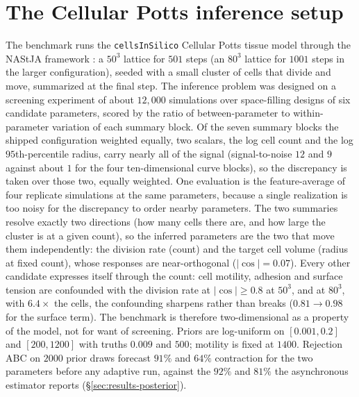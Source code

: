 \documentclass[10pt]{article}
\theoremstyle{plain}
\theoremstyle{definition}
\begin{document}
\section{The Cellular Potts inference setup}\label{app:cpm}
The benchmark runs the \texttt{cellsInSilico} Cellular Potts tissue model \citep{berghoff2020cis} through the NAStJA framework \citep{berghoff2018nastja}: a $50^3$ lattice for $501$ steps (an $80^3$ lattice for $1001$ steps in the larger configuration), seeded with a small cluster of cells that divide and move, summarized at the final step. The inference problem was designed on a screening experiment of about $12{,}000$ simulations over space-filling designs of six candidate parameters, scored by the ratio of between-parameter to within-parameter variation of each summary block. Of the seven summary blocks the shipped configuration weighted equally, two scalars, the log cell count and the log $95$th-percentile radius, carry nearly all of the signal (signal-to-noise $12$ and $9$ against about $1$ for the four ten-dimensional curve blocks), so the discrepancy is taken over those two, equally weighted. One evaluation is the feature-average of four replicate simulations at the same parameters, because a single realization is too noisy for the discrepancy to order nearby parameters. The two summaries resolve exactly two directions (how many cells there are, and how large the cluster is at a given count), so the inferred parameters are the two that move them independently: the division rate (count) and the target cell volume (radius at fixed count), whose responses are near-orthogonal ($|\cos|=0.07$). Every other candidate expresses itself through the count: cell motility, adhesion and surface tension are confounded with the division rate at $|\cos|\ge0.8$ at $50^3$, and at $80^3$, with $6.4\times$ the cells, the confounding sharpens rather than breaks ($0.81\to0.98$ for the surface term). The benchmark is therefore two-dimensional as a property of the model, not for want of screening. Priors are log-uniform on $[0.001,0.2]$ and $[200,1200]$ with truths $0.009$ and $500$; motility is fixed at $1400$. Rejection ABC on $2000$ prior draws forecast $91\%$ and $64\%$ contraction for the two parameters before any adaptive run, against the $92\%$ and $81\%$ the asynchronous estimator reports (\S\ref{sec:results-posterior}).
\end{document}
